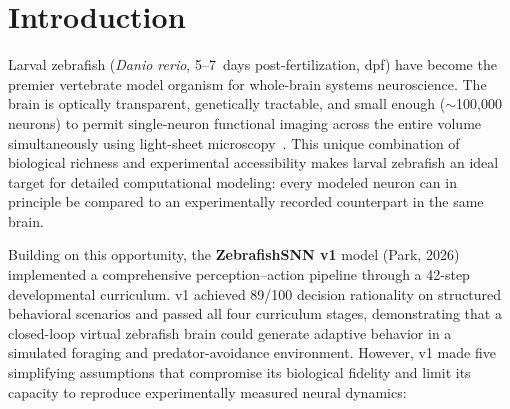 \documentclass[11pt,a4paper]{article}
\begin{document}
\begin{abstract}
All nine build phases passed their validation criteria (29 unit tests passed).
On five structured behavioral decision scenarios benchmarked against v1,
v2-GT achieves \textbf{94/100} (v1: 89/100) with ground-truth sensory access,
and v2-auto achieves \textbf{77/100} using only retinal vision, lateral line
mechanoreception, and internal state memory.
v2-GT exceeds v1 on Scenario~C ($+20$, spiking CeA burst $\to$ faster flee)
and Scenario~E ($+16$, theta-phase place cell trajectory planning).
The v2-auto gap was reduced from 22 to 12 points through five sensory
improvements: wider FoV (140$^\circ \to 200^\circ$), larger food detection
radius, symmetry-breaking Mauthner flee, binocular overlap zone, and
temporal bearing EMA smoothing.
v2 is the first zebrafish brain model to combine true spiking neurons,
E/I balance, four-axis neuromodulation, and a full closed-loop
perception--action pipeline with online learning capacity.

\medskip
\noindent\textbf{Keywords:} spiking neural network, zebrafish, Izhikevich neuron,
excitatory--inhibitory balance, three-factor STDP, neuromodulation, active inference,
computational neuroscience, biologically plausible artificial intelligence

\end{abstract}

\tableofcontents
\newpage

\section{Introduction}\label{sec:intro}

Larval zebrafish (\textit{Danio rerio}, 5--7~days post-fertilization, dpf)
have become the premier vertebrate model organism for whole-brain
systems neuroscience.
The brain is optically transparent, genetically tractable, and small enough
($\sim$100,000 neurons) to permit single-neuron functional imaging across
the entire volume simultaneously using light-sheet
microscopy~\cite{ahrens2013,portugues2014}.
This unique combination of biological richness and experimental accessibility
makes larval zebrafish an ideal target for detailed computational modeling:
every modeled neuron can in principle be compared to an experimentally recorded
counterpart in the same brain.

Building on this opportunity, the \textbf{ZebrafishSNN v1} model (Park, 2026)
implemented a comprehensive perception--action pipeline through a 42-step
developmental curriculum.
v1 achieved 89/100 decision rationality on structured behavioral scenarios
and passed all four curriculum stages, demonstrating that a closed-loop
virtual zebrafish brain could generate adaptive behavior in a simulated
foraging and predator-avoidance environment.
However, v1 made five simplifying assumptions that compromise its
biological fidelity and limit its capacity to reproduce experimentally
measured neural dynamics:
\end{document}
